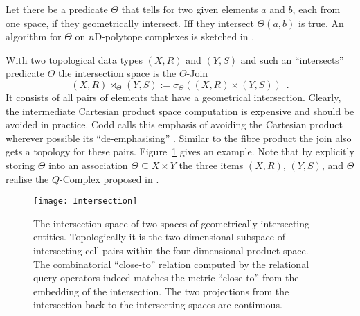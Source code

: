 \documentclass[5p]{elsarticle}
\newcommand{\qq}[1]{``#1''}
\begin{document}
Let there be a predicate $\Theta$ that tells for two given elements $a$ and $b$, each from 
one space, if they geometrically intersect. 
Iff they intersect $\Theta(a,b)$ is true. An algorithm for $\Theta$ on $n$D-polytope complexes 
is sketched in \cite{SimplicialDecomposition}. 

With two topological data types $(X,R)$ and $(Y,S)$ and such an \qq{intersects} predicate 
$\Theta$ the intersection space is the $\Theta$-Join 
$$
  (X,R)\Join_{\Theta}(Y,S) := \sigma_{\Theta}((X,R)\times(Y,S))\enspace.
$$
It consists of all pairs of elements that have a geometrical intersection. 
Clearly, the intermediate Cartesian product space computation is expensive and should be 
avoided in practice. Codd calls this emphasis of avoiding the 
Cartesian product wherever possible its \qq{de-emphasising} \cite{Codd:RMV2}. 
Similar to the fibre product the join also gets a topology for these pairs. 
Figure~\ref{fig:Intersection} gives an example. 
Note that by explicitly storing $\Theta$ into an association $\Theta\subseteq X\times Y$ the three 
items $(X,R)$, $(Y,S)$, and $\Theta$ realise the $Q$-Complex proposed in \cite{Qomplex}. 

\begin{figure}
\begin{center}
\texttt{[image: Intersection]}
\end{center}
\caption{The intersection space of two spaces of geometrically intersecting entities. 
Topologically it is the two-dimensional subspace of intersecting cell pairs within the 
four-dimensional product space. 
The combinatorial \qq{close-to} relation computed by the relational query 
operators indeed matches the metric \qq{close-to} from the embedding of the intersection. 
The two projections from the intersection back to the intersecting spaces are continuous.}
\label{fig:Intersection}
\end{figure}
\end{document}
